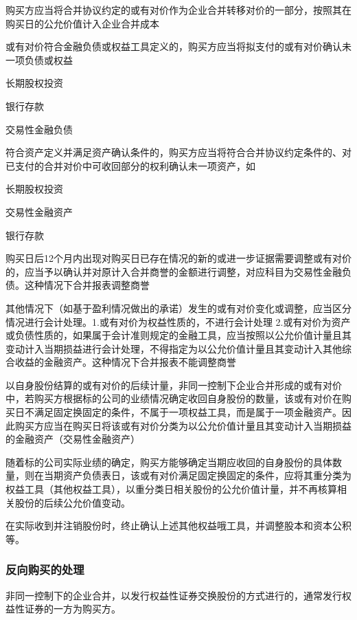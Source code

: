 \documentclass[UTF8,12pt]{ctexart}
\newenvironment{Dr}{%
	\begin{list}{}%
		{
			\setlength{\leftmargin}{2em}
			\setlength{\labelwidth}{2em}
			\setlength{\labelsep}{0pt}
			\setlength{\itemindent}{0pt}
			\setlength{\listparindent}{0pt}
			\setlength{\parsep}{0pt}
			\setlength{\topsep}{0pt}
		}
		\item[\textbf{借：}]
	}{%
	\end{list}
}
\newenvironment{Cr}{%
	\begin{list}{}%
		{
			\setlength{\leftmargin}{2em}
			\setlength{\labelwidth}{2em}
			\setlength{\labelsep}{0pt}
			\setlength{\itemindent}{0pt}
			\setlength{\listparindent}{0pt}
			\setlength{\parsep}{0pt}
			\setlength{\topsep}{0pt}
		}
		\item[\textbf{贷：}]
	}{%
	\end{list}
}
\numberwithin{equation}{section} %
\numberwithin{figure}{section}
\numberwithin{table}{section}
\begin{document}
	购买方应当将合并协议约定的或有对价作为企业合并转移对价的一部分，按照其在购买日的公允价值计入企业合并成本
	
	或有对价符合金融负债或权益工具定义的，购买方应当将拟支付的或有对价确认未一项负债或权益
	\begin{Dr}
		长期股权投资
	\end{Dr}
	\begin{Cr}
		银行存款
		
		交易性金融负债
	\end{Cr}
	
	符合资产定义并满足资产确认条件的，购买方应当将符合合并协议约定条件的、对已支付的合并对价中可收回部分的权利确认未一项资产，如
	\begin{Dr}
		长期股权投资
		
		交易性金融资产
	\end{Dr}
	\begin{Cr}
		银行存款
	\end{Cr}
	
	
	购买日后12个月内出现对购买日已存在情况的新的或进一步证据需要调整或有对价的，应当予以确认并对原计入合并商誉的金额进行调整，对应科目为交易性金融负债。这种情况下合并报表调整商誉
	
	其他情况下（如基于盈利情况做出的承诺）发生的或有对价变化或调整，应当区分情况进行会计处理。1.或有对价为权益性质的，不进行会计处理
	2.或有对价为资产或负债性质的，如果属于会计准则规定的金融工具，应当按照以公允价值计量且其变动计入当期损益进行会计处理，不得指定为以公允价值计量且其变动计入其他综合收益的金融资产。这种情况下合并报表不能调整商誉
	
	以自身股份结算的或有对价的后续计量，非同一控制下企业合并形成的或有对价中，若购买方根据标的公司的业绩情况确定收回自身股份的数量，该或有对价在购买日不满足固定换固定的条件，不属于一项权益工具，而是属于一项金融资产。因此购买方应当在购买日将该或有对价分类为以公允价值计量且其变动计入当期损益的金融资产（交易性金融资产）
	
	随着标的公司实际业绩的确定，购买方能够确定当期应收回的自身股份的具体数量，则在当期资产负债表日，该或有对价满足固定换固定的条件，应将其重分类为权益工具（其他权益工具），以重分类日相关股份的公允价值计量，并不再核算相关股份的后续公允价值变动。
	
	在实际收到并注销股份时，终止确认上述其他权益哦工具，并调整股本和资本公积等。
	\subsubsection{反向购买的处理}
	非同一控制下的企业合并，以发行权益性证券交换股份的方式进行的，通常发行权益性证券的一方为购买方。
	
\end{document}
